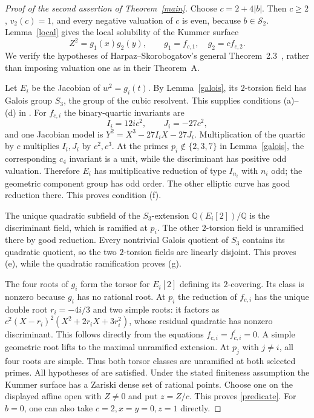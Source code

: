 \documentclass[11pt]{article}
\newcommand{\Q}{\mathbb Q}
\begin{document}
\begin{proof}[Proof of the second assertion of Theorem~\ref{main}]
Choose $c=2+4|b|$. Then $c\ge2$, $v_2(c)=1$, and every negative
valuation of $c$ is even, because $b\in\mathcal S_2$.
Lemma~\ref{local} gives the local solubility of the Kummer surface
\[
 Z^2=g_1(x)g_2(y),\qquad g_1=f_{c,1},\quad g_2=c f_{c,2}.
\]
We verify the hypotheses of Harpaz--Skorobogatov's general
Theorem~2.3~\cite{HS}, rather than imposing valuation one as in their
Theorem~A.

Let $E_i$ be the Jacobian of $w^2=g_i(t)$. By Lemma~\ref{galois}, its
$2$-torsion field has Galois group $S_3$, the group of the cubic
resolvent. This supplies conditions (a)--(d) in \cite{HS}. For
$f_{c,i}$ the binary-quartic invariants are
\[
 I_i=12ic^2,\qquad J_i=-27c^2,
\]
and one Jacobian model is
$Y^2=X^3-27I_iX-27J_i$. Multiplication of the quartic by $c$ multiplies
$I_i,J_i$ by $c^2,c^3$. At the primes $p_i\notin\{2,3,7\}$ in
Lemma~\ref{galois}, the corresponding $c_4$ invariant is a unit, while
the discriminant has positive odd valuation. Therefore $E_i$ has
multiplicative reduction of type $I_{n_i}$ with $n_i$ odd; the
geometric component group has odd order. The other elliptic curve has
good reduction there. This proves condition (f).

The unique quadratic subfield of the $S_3$-extension
$\Q(E_i[2])/\Q$ is the discriminant field, which is ramified at
$p_i$. The other $2$-torsion field is unramified there by good
reduction. Every nontrivial Galois quotient of $S_3$ contains its
quadratic quotient, so the two $2$-torsion fields are linearly disjoint.
This proves (e), while the quadratic ramification proves (g).

The four roots of $g_i$ form the torsor for $E_i[2]$ defining its
$2$-covering. Its class is nonzero because $g_i$ has no rational root.
At $p_i$ the reduction of $f_{c,i}$ has the unique double root
$r_i=-4i/3$ and two simple roots: it factors as
$c^2(X-r_i)^2(X^2+2r_iX+3r_i^2)$, whose residual quadratic has
nonzero discriminant. This follows directly from the equations
$f_{c,i}=f_{c,i}^{\prime}=0$. A simple geometric root lifts to the
maximal unramified extension. At $p_j$ with $j\ne i$, all four roots
are simple. Thus both torsor classes are unramified at both selected
primes. All hypotheses of \cite[Theorem~2.3]{HS} are satisfied. Under
the stated finiteness assumption the Kummer surface has a Zariski
dense set of rational points. Choose one on the displayed affine open
with $Z\ne0$ and put $z=Z/c$. This proves \eqref{predicate}.
For $b=0$, one can also take $c=2,x=y=0,z=1$ directly.
\end{proof}
\end{document}
